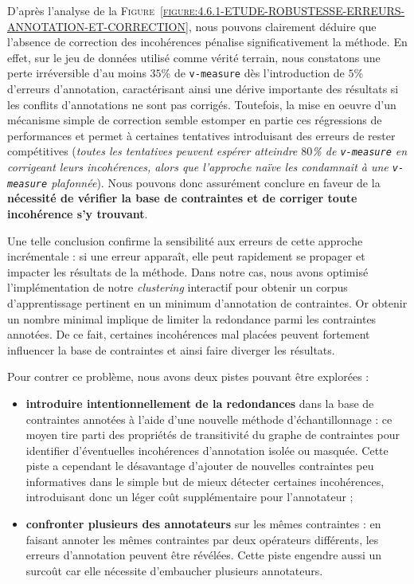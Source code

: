 			D'après l'analyse de la \textsc{Figure~\ref{figure:4.6.1-ETUDE-ROBUSTESSE-ERREURS-ANNOTATION-ET-CORRECTION}}, nous pouvons clairement déduire que l'absence de correction des incohérences pénalise significativement la méthode.
			En effet, sur le jeu de données utilisé comme vérité terrain, nous constatons une perte irréversible d'au moins $35$\% de \texttt{v-measure} dès l'introduction de $5$\% d'erreurs d'annotation, caractérisant ainsi une dérive importante des résultats si les conflits d'annotations ne sont pas corrigés.
			Toutefois, la mise en oeuvre d'un mécanisme simple de correction semble estomper en partie ces régressions de performances et permet à certaines tentatives introduisant des erreurs de rester compétitives
			(\textit{toutes les tentatives peuvent espérer atteindre $80$\% de \texttt{v-measure} en corrigeant leurs incohérences, alors que l'approche naïve les condamnait à une \texttt{v-measure} plafonnée}).
			Nous pouvons donc assurément conclure en faveur de la \textbf{nécessité de vérifier la base de contraintes et de corriger toute incohérence s'y trouvant}.
			
			Une telle conclusion confirme la sensibilité aux erreurs de cette approche incrémentale : si une erreur apparaît, elle peut rapidement se propager et impacter les résultats de la méthode.
			Dans notre cas, nous avons optimisé l'implémentation de notre \textit{clustering} interactif pour obtenir un corpus d'apprentissage pertinent en un minimum d'annotation de contraintes.
			Or obtenir un nombre minimal implique de limiter la redondance parmi les contraintes annotées.
			De ce fait, certaines incohérences mal placées peuvent fortement influencer la base de contraintes et ainsi faire diverger les résultats.
			
			Pour contrer ce problème, nous avons deux pistes pouvant être explorées :
			
			\begin{itemize}
				\item \textbf{introduire intentionnellement de la redondances} dans la base de contraintes annotées à l'aide d'une nouvelle méthode d'échantillonnage : ce moyen tire parti des propriétés de transitivité du graphe de contraintes pour identifier d'éventuelles incohérences d'annotation isolée ou masquée.
				Cette piste a cependant le désavantage d'ajouter de nouvelles contraintes peu informatives dans le simple but de mieux détecter certaines incohérences, introduisant donc un léger coût supplémentaire pour l'annotateur ;
				\item \textbf{confronter plusieurs des annotateurs} sur les mêmes contraintes : en faisant annoter les mêmes contraintes par deux opérateurs différents, les erreurs d'annotation peuvent être révélées.
				Cette piste engendre aussi un surcoût car elle nécessite d'embaucher plusieurs annotateurs.
			\end{itemize}
			
